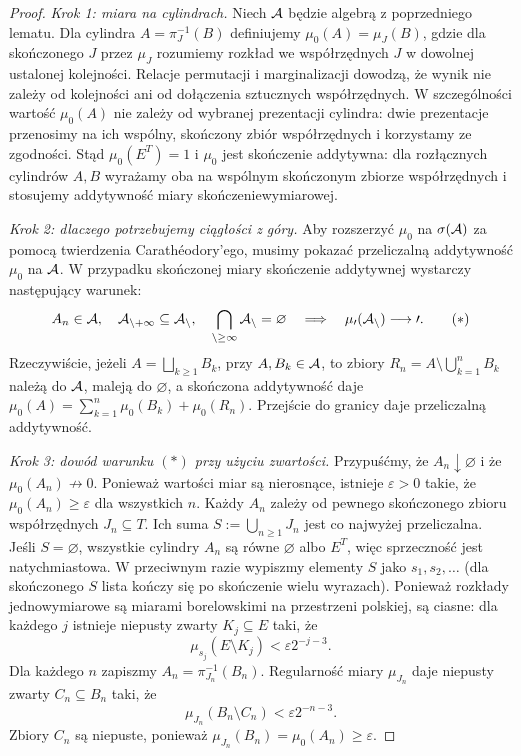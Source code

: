 \begin{proof}
\emph{Krok 1: miara na cylindrach.}
Niech $\cal A$ będzie algebrą z poprzedniego lematu.
Dla cylindra $A=\pi_J^{-1}(B)$ definiujemy
$\mu_0(A)=\mu_J(B)$, gdzie dla skończonego $J$
przez $\mu_J$ rozumiemy rozkład we współrzędnych $J$
w dowolnej ustalonej kolejności. Relacje permutacji i
marginalizacji dowodzą, że wynik nie zależy od kolejności
ani od dołączenia sztucznych współrzędnych. W szczególności
wartość $\mu_0(A)$ nie zależy od wybranej prezentacji
cylindra: dwie prezentacje przenosimy na ich wspólny,
skończony zbiór współrzędnych i korzystamy ze zgodności.
Stąd $\mu_0(E^T)=1$ i $\mu_0$ jest skończenie addytywna:
dla rozłącznych cylindrów $A,B$ wyrażamy oba na
wspólnym skończonym zbiorze współrzędnych i stosujemy
addytywność miary skończeniewymiarowej.

\emph{Krok 2: dlaczego potrzebujemy ciągłości z góry.}
Aby rozszerzyć $\mu_0$ na $\sigma(\cal A)$ za pomocą
twierdzenia Carathéodory'ego, musimy pokazać przeliczalną
addytywność $\mu_0$ na $\cal A$. W przypadku skończonej
miary skończenie addytywnej wystarczy następujący warunek:
\[
A_n\in\cal A,\quad A_{n+1}\subseteq A_n,\quad
\bigcap_{n\ge1}A_n=\varnothing
\quad\Longrightarrow\quad \mu_0(A_n)\longrightarrow0.
\tag{$*$}
\]
Rzeczywiście, jeżeli $A=\bigsqcup_{k\ge1}B_k$,
przy $A,B_k\in\cal A$, to zbiory
$R_n=A\setminus\bigcup_{k=1}^n B_k$ należą do $\cal A$,
maleją do $\varnothing$, a skończona addytywność daje
$\mu_0(A)=\sum_{k=1}^n\mu_0(B_k)+\mu_0(R_n)$.
Przejście do granicy daje przeliczalną addytywność.

\emph{Krok 3: dowód warunku $(*)$ przy użyciu zwartości.}
Przypuśćmy, że $A_n\downarrow\varnothing$ i że
$\mu_0(A_n)\not\to0$. Ponieważ wartości miar są
nierosnące, istnieje $\varepsilon>0$ takie, że
$\mu_0(A_n)\ge\varepsilon$ dla wszystkich $n$.
Każdy $A_n$ zależy od pewnego skończonego zbioru
współrzędnych $J_n\subseteq T$. Ich suma
$S:=\bigcup_{n\ge1}J_n$ jest co najwyżej przeliczalna.
Jeśli $S=\varnothing$, wszystkie cylindry $A_n$ są
równe $\varnothing$ albo $E^T$, więc sprzeczność jest
natychmiastowa. W przeciwnym razie wypiszmy elementy
$S$ jako $s_1,s_2,\ldots$ (dla skończonego $S$
lista kończy się po skończenie wielu wyrazach). Ponieważ rozkłady
jednowymiarowe są miarami borelowskimi na przestrzeni
polskiej, są ciasne: dla każdego $j$ istnieje niepusty
zwarty $K_j\subseteq E$ taki, że
\[
\mu_{s_j}(E\setminus K_j)<\varepsilon2^{-j-3}.
\tag{1}
\]
Dla każdego $n$ zapiszmy $A_n=\pi_{J_n}^{-1}(B_n)$.
Regularność miary $\mu_{J_n}$ daje niepusty zwarty
$C_n\subseteq B_n$ taki, że
\[
\mu_{J_n}(B_n\setminus C_n)<\varepsilon2^{-n-3}.
\tag{2}
\]
Zbiory $C_n$ są niepuste, ponieważ
$\mu_{J_n}(B_n)=\mu_0(A_n)\ge\varepsilon$.


\end{proof}
